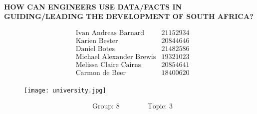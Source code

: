 \begin{titlepage}

\begin{center}
\Large\textbf{\\\MakeUppercase{How can engineers use data/facts in guiding/leading the development of South Africa?}}\par
\end{center}

\Large
\begin{center}
\begin{align*}
&\text{Ivan Andreas Barnard} & \text{21152934}\\
&\text{Karien Bester} & \text{20844646}\\
&\text{Daniel Botes} & \text{21482586}\\
&\text{Michael Alexander Brewis} & \text{19321023}\\
&\text{Melissa Claire Cairns} & \text{20854641}\\
&\text{Carmon de Beer} & \text{18400620}\\
\end{align*}
\end{center}

\begin{figure}[H]
	\begin{center}
	\texttt{[image: university.jpg]}
	\end{center}	
\end{figure}
\Large

\vfill
\begin{center}
\begin{align*}
&\text{Group: 8} &&&&& \text{Topic: 3}\\
\end{align*}
\end{center}	
\end{titlepage}